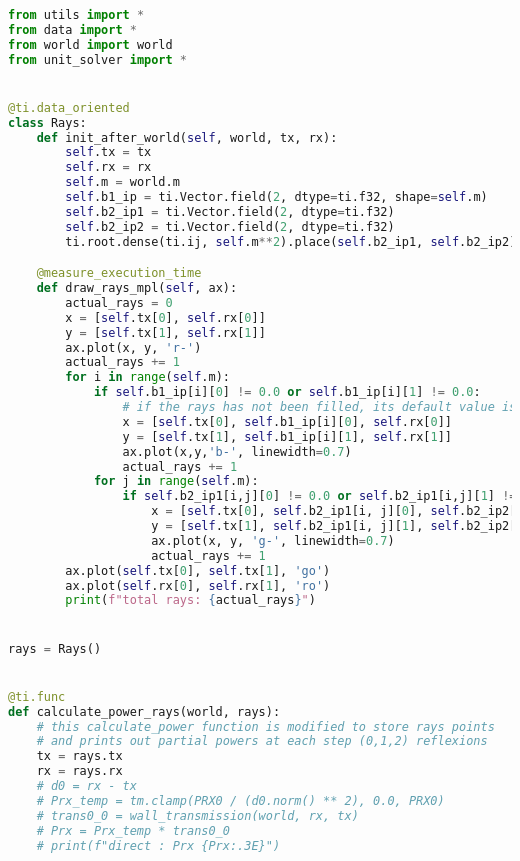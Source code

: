 \begin{lstlisting}[language=python]
from utils import *
from data import *
from world import world
from unit_solver import *


@ti.data_oriented
class Rays:
    def init_after_world(self, world, tx, rx):
        self.tx = tx
        self.rx = rx
        self.m = world.m
        self.b1_ip = ti.Vector.field(2, dtype=ti.f32, shape=self.m)
        self.b2_ip1 = ti.Vector.field(2, dtype=ti.f32)
        self.b2_ip2 = ti.Vector.field(2, dtype=ti.f32)
        ti.root.dense(ti.ij, self.m**2).place(self.b2_ip1, self.b2_ip2)

    @measure_execution_time
    def draw_rays_mpl(self, ax):
        actual_rays = 0
        x = [self.tx[0], self.rx[0]]
        y = [self.tx[1], self.rx[1]]
        ax.plot(x, y, 'r-')
        actual_rays += 1
        for i in range(self.m):
            if self.b1_ip[i][0] != 0.0 or self.b1_ip[i][1] != 0.0:
                # if the rays has not been filled, its default value is 0.0 and it gets ignored
                x = [self.tx[0], self.b1_ip[i][0], self.rx[0]]
                y = [self.tx[1], self.b1_ip[i][1], self.rx[1]]
                ax.plot(x,y,'b-', linewidth=0.7)
                actual_rays += 1
            for j in range(self.m):
                if self.b2_ip1[i,j][0] != 0.0 or self.b2_ip1[i,j][1] != 0.0 or self.b2_ip2[i,j][0] != 0.0 or self.b2_ip2[i,j][1] != 0.0:
                    x = [self.tx[0], self.b2_ip1[i, j][0], self.b2_ip2[i, j][0], self.rx[0]]
                    y = [self.tx[1], self.b2_ip1[i, j][1], self.b2_ip2[i, j][1], self.rx[1]]
                    ax.plot(x, y, 'g-', linewidth=0.7)
                    actual_rays += 1
        ax.plot(self.tx[0], self.tx[1], 'go')
        ax.plot(self.rx[0], self.rx[1], 'ro')
        print(f"total rays: {actual_rays}")


rays = Rays()


@ti.func
def calculate_power_rays(world, rays):
    # this calculate_power function is modified to store rays points
    # and prints out partial powers at each step (0,1,2) reflexions
    tx = rays.tx
    rx = rays.rx
    # d0 = rx - tx
    # Prx_temp = tm.clamp(PRX0 / (d0.norm() ** 2), 0.0, PRX0)
    # trans0_0 = wall_transmission(world, rx, tx)
    # Prx = Prx_temp * trans0_0
    # print(f"direct : Prx {Prx:.3E}")


\end{lstlisting}
